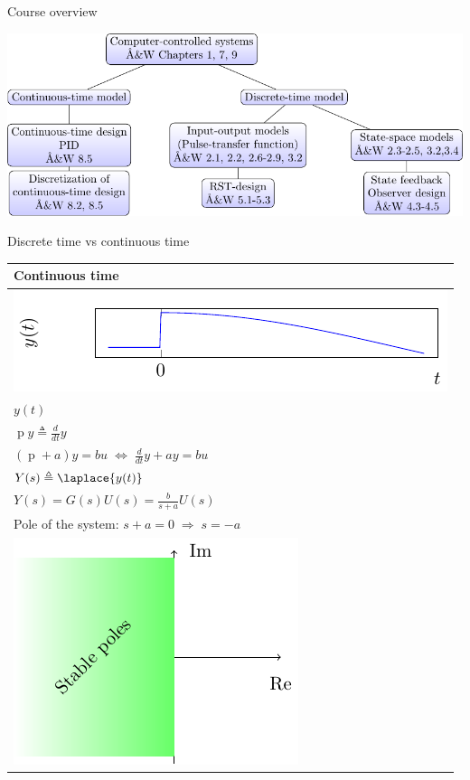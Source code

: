 \documentclass[presentation,aspectratio=169]{beamer}
\begin{document}
\begin{frame}[label=sec-5-3]{Course overview}
\begin{center}
\includegraphics[width=\linewidth]{../../figures/computer-control-approaches}
\end{center}
\end{frame}

\begin{frame}[label=sec-5-4]{Discrete time vs continuous time}
\begin{center}
\begin{tabular}{l}
Continuous time\\
\hline
\includegraphics[width=0.4\linewidth]{../../figures/cont-fcn}\\
\(y(t)\)\\
\(\operatorname{p} y \triangleq \frac{d}{dt} y\)\\
\( (\operatorname{p}+a) y = bu \;\Leftrightarrow\; \frac{d}{dt}y + ay = bu\)\\
\(Y(s) \triangleq \laplace{y(t)}\)\\
\( Y(s) = G(s)U(s) = \frac{b}{s+a}U(s)\)\\
Pole of the system: \(s+a=0 \; \Rightarrow \; s = -a\)\\
\includegraphics[width=0.22\linewidth]{../../figures/cont-stable}\\
\hline
\end{tabular}
\end{center}
\end{frame}
\end{document}
